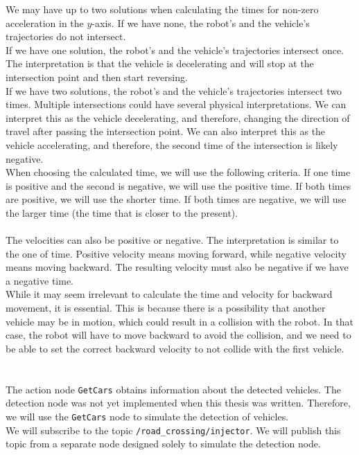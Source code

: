         We may have up to two solutions when calculating the times for non-zero acceleration in the $y$-axis. If we have none, the robot's and the vehicle's trajectories do not intersect.\\
        If we have one solution, the robot's and the vehicle's trajectories intersect once. The interpretation is that the vehicle is decelerating and will stop at the intersection point and then start reversing.\\
        If we have two solutions, the robot's and the vehicle's trajectories intersect two times. Multiple intersections could have several physical interpretations. We can interpret this as the vehicle decelerating, and therefore, changing the direction of travel after passing the intersection point. We can also interpret this as the vehicle accelerating, and therefore, the second time of the intersection is likely negative.\\
        When choosing the calculated time, we will use the following criteria. If one time is positive and the second is negative, we will use the positive time. If both times are positive, we will use the shorter time. If both times are negative, we will use the larger time (the time that is closer to the present).\\\\
        The velocities can also be positive or negative. The interpretation is similar to the one of time. Positive velocity means moving forward, while negative velocity means moving backward. The resulting velocity must also be negative if we have a negative time.\\
        While it may seem irrelevant to calculate the time and velocity for backward movement, it is essential. This is because there is a possibility that another vehicle may be in motion, which could result in a collision with the robot. In that case, the robot will have to move backward to avoid the collision, and we need to be able to set the correct backward velocity to not collide with the first vehicle.\\\\
    \\
        The action node \texttt{GetCars} obtains information about the detected vehicles. The detection node was not yet implemented when this thesis was written. Therefore, we will use the \texttt{GetCars} node to simulate the detection of vehicles.\\
        We will subscribe to the topic \texttt{/road\_crossing/injector}. We will publish this topic from a separate node designed solely to simulate the detection node.\\

